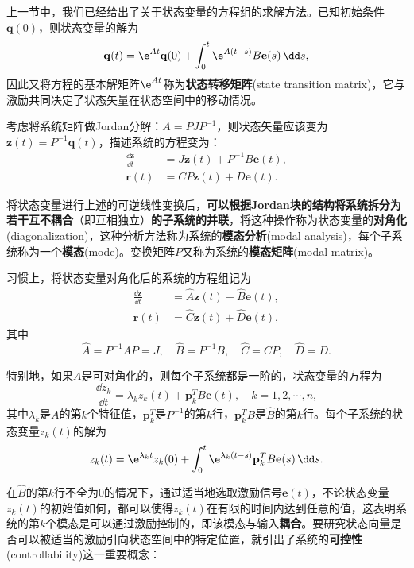 上一节中，我们已经给出了关于状态变量的方程组的求解方法。已知初始条件$\mathbf{q}(0)$，则状态变量的解为
\begin{equation}
    \mathbf{q}(t)=\e^{At}\mathbf{q}(0)+\int_{0}^t \e^{A(t-s)}B\mathbf{e}(s)\,\dd s,
\end{equation}
因此又将方程的基本解矩阵$\e^{At}$称为\textbf{状态转移矩阵}(state transition matrix)，它与激励共同决定了状态矢量在状态空间中的移动情况。

考虑将系统矩阵做Jordan分解：$A=PJP^{-1}$，则状态矢量应该变为$\mathbf{z}(t)=P^{-1}\mathbf{q}(t)$，描述系统的方程变为：
\begin{align}
    \frac{\dd\mathbf{z}}{\dd t}&=J\mathbf{z}(t)+P^{-1}B\mathbf{e}(t),\\
    \mathbf{r}(t)&=CP\mathbf{z}(t)+D\mathbf{e}(t).
\end{align}

将状态变量进行上述的可逆线性变换后，\textbf{可以根据Jordan块的结构将系统拆分为若干互不耦合}（即互相独立）\textbf{的子系统的并联}，将这种操作称为状态变量的\textbf{对角化}(diagonalization)，这种分析方法称为系统的\textbf{模态分析}(modal analysis)，每个子系统称为一个\textbf{模态}(mode)。变换矩阵$P$又称为系统的\textbf{模态矩阵}(modal matrix)。

习惯上，将状态变量对角化后的系统的方程组记为
\begin{align}
    \frac{\dd\mathbf{z}}{\dd t}&=\hat{A}\mathbf{z}(t)+\hat{B}\mathbf{e}(t),\\
    \mathbf{r}(t)&=\hat{C}\mathbf{z}(t)+\hat{D}\mathbf{e}(t),
\end{align}
其中
\begin{equation}
    \hat{A}=P^{-1}AP=J,\quad \hat{B}=P^{-1}B,\quad \hat{C}=CP,\quad \hat{D}=D.
\end{equation}

特别地，如果$A$是可对角化的，则每个子系统都是一阶的，状态变量的方程为
\begin{equation}
    \frac{\dd z_k}{\dd t}=\lambda_k z_k(t)+\mathbf{p}_k^T B\mathbf{e}(t),\quad k=1,2,\cdots,n,
\end{equation}
其中$\lambda_k$是$A$的第$k$个特征值，$\mathbf{p}_k^T$是$P^{-1}$的第$k$行，$\mathbf{p}_k^T B$是$\hat{B}$的第$k$行。每个子系统的状态变量$z_k(t)$的解为
\begin{equation}
    z_k(t)=\e^{\lambda_k t}z_k(0)+\int_0^t \e^{\lambda_k (t-s)}\mathbf{p}_k^TB\mathbf{e}(s)\,\dd s.
\end{equation}

在$\hat{B}$的第$k$行不全为$0$的情况下，通过适当地选取激励信号$\mathbf{e}(t)$，不论状态变量$z_k(t)$的初始值如何，都可以使得$z_k(t)$在有限的时间内达到任意的值，这表明系统的第$k$个模态是可以通过激励控制的，即该模态与输入\textbf{耦合}。要研究状态向量是否可以被适当的激励引向状态空间中的特定位置，就引出了系统的\textbf{可控性}(controllability)这一重要概念：

